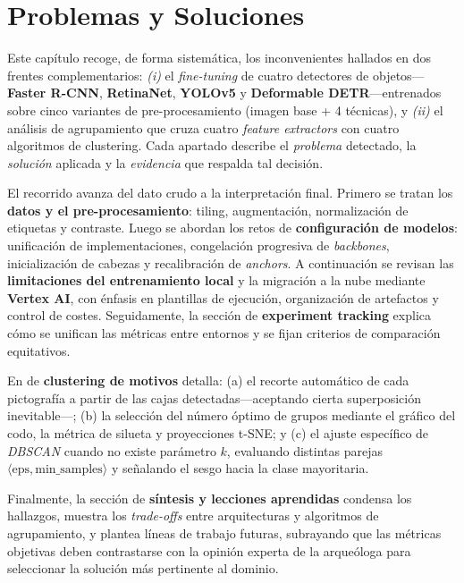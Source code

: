 \chapter{Problemas y Soluciones}\label{ch:problemas_y_soluciones}
\noindent
Este capítulo recoge, de forma sistemática, los inconvenientes hallados en dos frentes complementarios:
\emph{(i)} el \emph{fine-tuning} de cuatro detectores de objetos—\textbf{Faster R-CNN}, \textbf{RetinaNet}, \textbf{YOLOv5} y \textbf{Deformable DETR}—entrenados sobre cinco variantes de pre-procesamiento (imagen base + 4 técnicas), y
\emph{(ii)} el análisis de agrupamiento que cruza cuatro \emph{feature extractors} con cuatro algoritmos de clustering.
Cada apartado describe el \emph{problema} detectado, la \emph{solución} aplicada y la \emph{evidencia} que respalda tal decisión.

El recorrido avanza del dato crudo a la interpretación final.
Primero se tratan los \textbf{datos y el pre-procesamiento}: tiling, augmentación, normalización de etiquetas y contraste.
Luego se abordan los retos de \textbf{configuración de modelos}: unificación de implementaciones, congelación progresiva de \emph{backbones}, inicialización de cabezas y recalibración de \emph{anchors}.
A continuación se revisan las \textbf{limitaciones del entrenamiento local} y la migración a la nube mediante \textbf{Vertex AI}, con énfasis en plantillas de ejecución, organización de artefactos y control de costes.
Seguidamente, la sección de \textbf{experiment tracking} explica cómo se unifican las métricas entre entornos y se fijan criterios de comparación equitativos.

En de \textbf{clustering de motivos} detalla: (a) el recorte automático de cada pictografía a partir de las cajas detectadas—aceptando cierta superposición inevitable—; (b) la selección del número óptimo de grupos mediante el gráfico del codo, la métrica de silueta y proyecciones t-SNE; y (c) el ajuste específico de \textit{DBSCAN} cuando no existe parámetro \(k\), evaluando distintas parejas \(\langle\text{eps},\text{min\_samples}\rangle\) y señalando el sesgo hacia la clase mayoritaria.

Finalmente, la sección de \textbf{síntesis y lecciones aprendidas} condensa los hallazgos, muestra los \emph{trade-offs} entre arquitecturas y algoritmos de agrupamiento, y plantea líneas de trabajo futuras, subrayando que las métricas objetivas deben contrastarse con la opinión experta de la arqueóloga para seleccionar la solución más pertinente al dominio.
